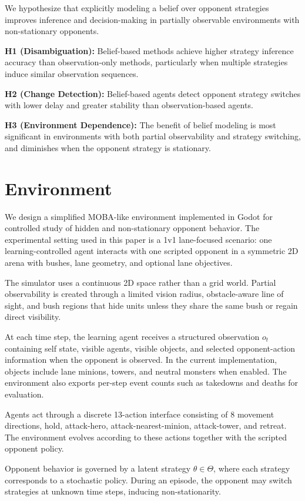 \documentclass{article}
\begin{document}
We hypothesize that explicitly modeling a belief over opponent strategies improves inference and decision-making in partially observable environments with non-stationary opponents.

\textbf{H1 (Disambiguation):} Belief-based methods achieve higher strategy inference accuracy than observation-only methods, particularly when multiple strategies induce similar observation sequences.

\textbf{H2 (Change Detection):} Belief-based agents detect opponent strategy switches with lower delay and greater stability than observation-based agents.

\textbf{H3 (Environment Dependence):} The benefit of belief modeling is most significant in environments with both partial observability and strategy switching, and diminishes when the opponent strategy is stationary.

\section{Environment}

We design a simplified MOBA-like environment implemented in Godot for controlled study of hidden and non-stationary opponent behavior. The experimental setting used in this paper is a 1v1 lane-focused scenario: one learning-controlled agent interacts with one scripted opponent in a symmetric 2D arena with bushes, lane geometry, and optional lane objectives.

The simulator uses a continuous 2D space rather than a grid world. Partial observability is created through a limited vision radius, obstacle-aware line of sight, and bush regions that hide units unless they share the same bush or regain direct visibility.

At each time step, the learning agent receives a structured observation $o_t$ containing self state, visible agents, visible objects, and selected opponent-action information when the opponent is observed. In the current implementation, objects include lane minions, towers, and neutral monsters when enabled. The environment also exports per-step event counts such as takedowns and deaths for evaluation.

Agents act through a discrete 13-action interface consisting of 8 movement directions, hold, attack-hero, attack-nearest-minion, attack-tower, and retreat. The environment evolves according to these actions together with the scripted opponent policy.

Opponent behavior is governed by a latent strategy $\theta \in \Theta$, where each strategy corresponds to a stochastic policy. During an episode, the opponent may switch strategies at unknown time steps, inducing non-stationarity.
\end{document}
